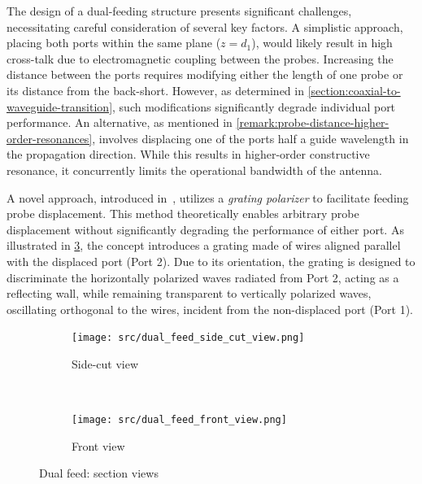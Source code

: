 \documentclass[14pt,a4paper]{ntust_report}
\begin{document}
The design of a dual-feeding structure presents significant challenges, necessitating careful consideration of several key factors. A simplistic approach, placing both ports within the same plane ($z = d_1$), would likely result in high cross-talk due to electromagnetic coupling between the probes. Increasing the distance between the ports requires modifying either the length of one probe or its distance from the back-short. However, as determined in \cref{section:coaxial-to-waveguide-transition}, such modifications significantly degrade individual port performance. An alternative, as mentioned in \cref{remark:probe-distance-higher-order-resonances}, involves displacing one of the ports half a guide wavelength in the propagation direction. While this results in higher-order constructive resonance, it concurrently limits the operational bandwidth of the antenna.

A novel approach, introduced in~\parencite{karki-et-al:dual-polarized-probe-for-planar-near-field-measurement}, utilizes a \emph{grating polarizer} to facilitate feeding probe displacement. This method theoretically enables arbitrary probe displacement without significantly degrading the performance of either port. As illustrated in \cref{fig:dual-feed-model}, the concept introduces a grating made of wires aligned parallel with the displaced port (Port 2). Due to its orientation, the grating is designed to discriminate the horizontally polarized waves radiated from Port 2, acting as a reflecting wall, while remaining transparent to vertically polarized waves, oscillating orthogonal to the wires, incident from the non-displaced port (Port 1).

\begin{figure}[!ht]
    \centering
    \begin{subfigure}{.8\textwidth}
        \centering
        \texttt{[image: src/dual\_feed\_side\_cut\_view.png]}
        \caption{\label{fig:dual-feed-side-cut-view}Side-cut view}
    \end{subfigure}
    \\[0.5cm]
    \begin{subfigure}{.4\textwidth}
        \centering
        \texttt{[image: src/dual\_feed\_front\_view.png]}
        \caption{\label{fig:dual-feed-front-view}Front view}
    \end{subfigure}
    \caption{\label{fig:dual-feed-model}Dual feed: section views}
\end{figure}
\end{document}
